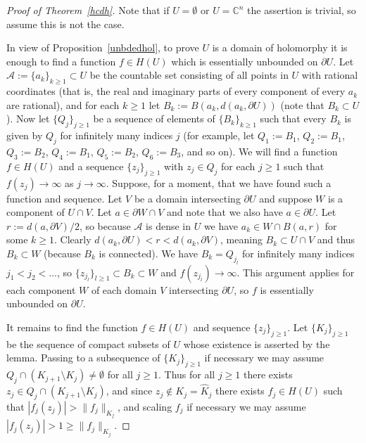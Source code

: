 \documentclass[11pt,a4paper, final, twoside]{article}
\numberwithin{equation}{section}
\newcommand{\C}{\mathbb C}
\newcommand{\bd}{\partial}
\newcommand{\ball}{B}
\newcommand{\emetric}{d}
\newcommand{\hol}{H}
\begin{document}
\begin{proof}[Proof of Theorem~\ref{hcdh}]
Note that if $U=\emptyset$ or $U=\C^n$ the assertion is trivial, so assume this is not the case.

In view of Proposition~\ref{unbdedhol}, to prove $U$ is a domain of holomorphy it is enough to find a function $f\in\hol(U)$ which is essentially unbounded on $\bd U$.
Let $\mathcal A:=\{a_k\}_{k\geq 1}\subset U$ be the countable set consisting of all points in $U$ with rational coordinates (that is, the real and imaginary parts of every component of every $a_k$ are rational),
and for each $k\geq 1$ let $B_k:=\ball(a_k,\emetric(a_k,\bd U))$ (note that $B_k\subset U$).
Now let $\{Q_j\}_{j\geq 1}$ be a sequence of elements of $\{B_k\}_{k\geq 1}$ such that every $B_k$ is given by $Q_j$ for
infinitely many indices $j$ (for example, let $Q_1:=B_1$, $Q_2:=B_1$, $Q_3:=B_2$, $Q_4:=B_1$, $Q_5:=B_2$, $Q_6:=B_3$, and so on). We will find a function $f\in\hol(U)$ and a sequence
$\{z_j\}_{j\geq 1}$ with $z_j\in Q_j$ for each $j\geq 1$ such that $f(z_j)\to\infty$ as $j\to\infty$. Suppose, for a moment, that we have found such a function and sequence.
Let $V$ be a domain intersecting $\bd U$ and suppose $W$ is a component of $U\cap V$. Let $a\in\bd W\cap V$ and note that we also have $a\in \bd U$. Let $r:=\emetric(a,\bd V)/2$, so
because
$\mathcal A$ is dense in $U$ we have $a_k\in W\cap\ball(a,r)$ for some $k\geq 1$. Clearly $\emetric(a_k,\bd U)<r<\emetric(a_k,\bd V)$, meaning
$B_k\subset U\cap V$ and thus $B_k\subset W$ (because $B_k$ is connected). We have $B_k=Q_{j_l}$ for infinitely many indices $j_1<j_2<\dots$, so $\{z_{j_l}\}_{l\geq 1}\subset B_k\subset W$
and $f(z_{j_l})\to\infty$. This argument applies for each component $W$ of each domain $V$ intersecting $\bd U$, so $f$ is essentially unbounded on $\bd U$.

It remains to find the function $f\in\hol(U)$ and sequence $\{z_j\}_{j\geq 1}$. Let $\{K_j\}_{j\geq 1}$ be the sequence of compact subsets of $U$ whose existence is asserted by the lemma. Passing
to a subsequence of $\{K_j\}_{j\geq 1}$ if necessary we may assume $Q_j\cap (K_{j+1}\setminus K_j)\neq\emptyset$ for all $j\geq 1$.
 Thus for all $j\geq 1$ there exists $z_j\in Q_j\cap (K_{j+1}\setminus K_j)$, and since
$z_j\not\in K_j=\hat K_j$ there exists $f_j\in\hol(U)$ such that $|f_j(z_j)|>\|f_j\|_{K_j}$, and scaling $f_j$ if necessary we may assume $|f_j(z_j)|>1\geq \|f_j\|_{K_j}$.


\end{proof}
\end{document}

